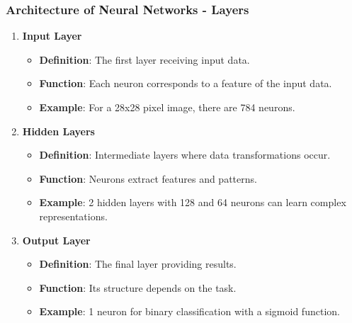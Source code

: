\documentclass[aspectratio=169]{beamer}
\begin{document}
\begin{frame}[fragile]
    \frametitle{Architecture of Neural Networks - Layers}
    \begin{enumerate}
        \item \textbf{Input Layer}
        \begin{itemize}
            \item \textbf{Definition}: The first layer receiving input data.
            \item \textbf{Function}: Each neuron corresponds to a feature of the input data.
            \item \textbf{Example}: For a 28x28 pixel image, there are 784 neurons.
        \end{itemize}

        \item \textbf{Hidden Layers}
        \begin{itemize}
            \item \textbf{Definition}: Intermediate layers where data transformations occur.
            \item \textbf{Function}: Neurons extract features and patterns.
            \item \textbf{Example}: 2 hidden layers with 128 and 64 neurons can learn complex representations.
        \end{itemize}

        \item \textbf{Output Layer}
        \begin{itemize}
            \item \textbf{Definition}: The final layer providing results.
            \item \textbf{Function}: Its structure depends on the task.
            \item \textbf{Example}: 1 neuron for binary classification with a sigmoid function.
        \end{itemize}
    \end{enumerate}
\end{frame}
\end{document}

